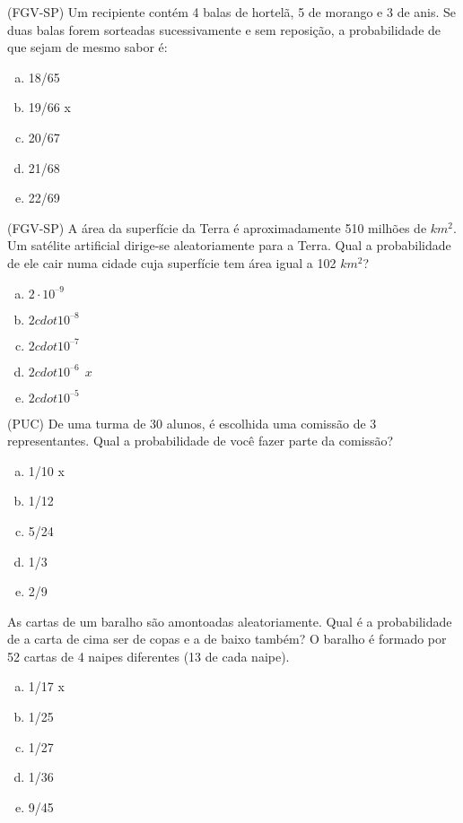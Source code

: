 \item (FGV-SP) Um recipiente contém 4 balas de hortelã, 5 de morango e 3 de anis. Se duas balas forem sorteadas sucessivamente e sem reposição, a probabilidade de que sejam de mesmo sabor é:
\begin{multicols}{5}
\begin{enumerate}[a)]
	\item 18/65 
	\item 19/66 x
	\item 20/67
	\item 21/68
	\item 22/69
\end{enumerate}
\end{multicols}

\item (FGV-SP) A área da superfície da Terra é aproximadamente 510 milhões de $km^2$. Um satélite artificial dirige-se aleatoriamente para a Terra. Qual a probabilidade de ele cair numa cidade cuja superfície tem área igual a 102 $km^2$?
\begin{multicols}{5}
\begin{enumerate}[a)]
	\item $2\cdot 10^{–9}$
	\item $2cdot 10^{–8}$
	\item $2cdot 10^{–7}$
	\item $2cdot 10^{–6} \ \ x$
	\item $2cdot 10^{–5}$
\end{enumerate}
\end{multicols}

\item (PUC) De uma turma de 30 alunos, é escolhida uma comissão de 3 representantes. Qual a probabilidade de você fazer parte da comissão?
\begin{multicols}{5}
\begin{enumerate}[a)]
	\item 1/10 x
	\item 1/12 
	\item 5/24
	\item 1/3
	\item 2/9
\end{enumerate}
\end{multicols}

\item As cartas de um baralho são amontoadas aleatoriamente. Qual é a probabilidade de a carta de cima ser de copas e a de baixo também? O baralho é formado por 52 cartas de 4 naipes diferentes (13 de cada naipe).
\begin{multicols}{5}
\begin{enumerate}[a)]
	\item 1/17  x
	\item 1/25
	\item 1/27
	\item 1/36
	\item 9/45
\end{enumerate}
\end{multicols}


